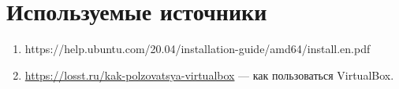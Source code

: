 \documentclass[14pt, a4paper]{article}
\begin{document}
\section*{Используемые источники}
\begin{enumerate}
    \item https://help.ubuntu.com/20.04/installation-guide/amd64/install.en.pdf
    \item \href{https://losst.ru/kak-polzovatsya-virtualbox}{https://losst.ru/kak-polzovatsya-virtualbox} — как пользоваться VirtualBox.
\end{enumerate}
\end{document}
